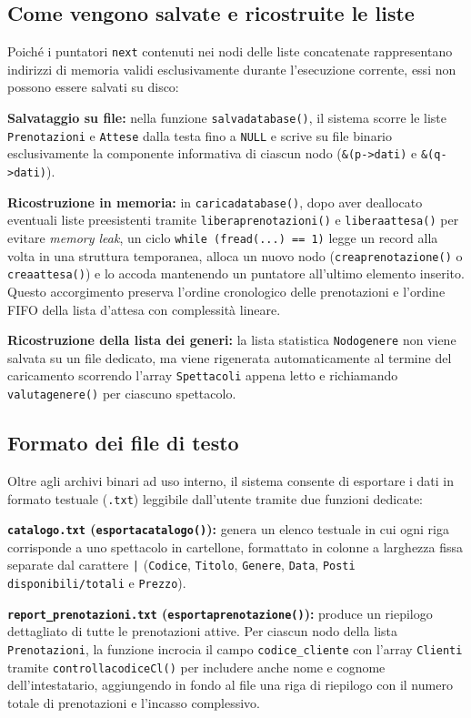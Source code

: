 \documentclass[11pt,a4paper,oneside,openany]{book}
\newenvironment{listacomp}{%
    \small
    \begin{list}{\textendash}{%
        \setlength{\topsep}{2pt}%
        \setlength{\partopsep}{0pt}%
        \setlength{\itemsep}{1pt}%
        \setlength{\parsep}{0pt}%
        \setlength{\leftmargin}{1.2em}%
    }%
}{%
    \end{list}%
}
\begin{document}
\subsection{Come vengono salvate e ricostruite le liste}
Poiché i puntatori \texttt{next} contenuti nei nodi delle liste concatenate rappresentano indirizzi di memoria validi esclusivamente durante l'esecuzione corrente, essi non possono essere salvati su disco:
\begin{listacomp}
    \item \textbf{Salvataggio su file:} nella funzione \texttt{salvadatabase()}, il sistema scorre le liste \texttt{Prenotazioni} e \texttt{Attese} dalla testa fino a \texttt{NULL} e scrive su file binario esclusivamente la componente informativa di ciascun nodo (\texttt{\&(p->dati)} e \texttt{\&(q->dati)}).
    \item \textbf{Ricostruzione in memoria:} in \texttt{caricadatabase()}, dopo aver deallocato eventuali liste preesistenti tramite \texttt{liberaprenotazioni()} e \texttt{liberaattesa()} per evitare \emph{memory leak}, un ciclo \texttt{while (fread(...) == 1)} legge un record alla volta in una struttura temporanea, alloca un nuovo nodo (\texttt{creaprenotazione()} o \texttt{creaattesa()}) e lo accoda mantenendo un puntatore all'ultimo elemento inserito. Questo accorgimento preserva l'ordine cronologico delle prenotazioni e l'ordine FIFO della lista d'attesa con complessità lineare.
    \item \textbf{Ricostruzione della lista dei generi:} la lista statistica \texttt{Nodogenere} non viene salvata su un file dedicato, ma viene rigenerata automaticamente al termine del caricamento scorrendo l'array \texttt{Spettacoli} appena letto e richiamando \texttt{valutagenere()} per ciascuno spettacolo.
\end{listacomp}

\subsection{Formato dei file di testo}
Oltre agli archivi binari ad uso interno, il sistema consente di esportare i dati in formato testuale (\texttt{.txt}) leggibile dall'utente tramite due funzioni dedicate:
\begin{listacomp}
    \item \textbf{\texttt{catalogo.txt} (\texttt{esportacatalogo()}):} genera un elenco testuale in cui ogni riga corrisponde a uno spettacolo in cartellone, formattato in colonne a larghezza fissa separate dal carattere \texttt{|} (\texttt{Codice}, \texttt{Titolo}, \texttt{Genere}, \texttt{Data}, \texttt{Posti disponibili/totali} e \texttt{Prezzo}).
    \item \textbf{\texttt{report\_prenotazioni.txt} (\texttt{esportaprenotazione()}):} produce un riepilogo dettagliato di tutte le prenotazioni attive. Per ciascun nodo della lista \texttt{Prenotazioni}, la funzione incrocia il campo \texttt{codice\_cliente} con l'array \texttt{Clienti} tramite \texttt{controllacodiceCl()} per includere anche nome e cognome dell'intestatario, aggiungendo in fondo al file una riga di riepilogo con il numero totale di prenotazioni e l'incasso complessivo.
\end{listacomp}
\end{document}
